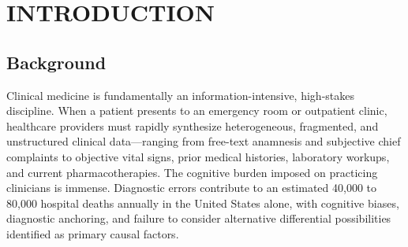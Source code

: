 \documentclass[12pt,a4paper]{report}
\begin{document}
\newpage
{}
\setcounter{page}{1}

\chapter{INTRODUCTION}

\section{Background}
Clinical medicine is fundamentally an information-intensive, high-stakes discipline. When a patient presents to an emergency room or outpatient clinic, healthcare providers must rapidly synthesize heterogeneous, fragmented, and unstructured clinical data---ranging from free-text anamnesis and subjective chief complaints to objective vital signs, prior medical histories, laboratory workups, and current pharmacotherapies. The cognitive burden imposed on practicing clinicians is immense. Diagnostic errors contribute to an estimated 40,000 to 80,000 hospital deaths annually in the United States alone, with cognitive biases, diagnostic anchoring, and failure to consider alternative differential possibilities identified as primary causal factors.
\end{document}
